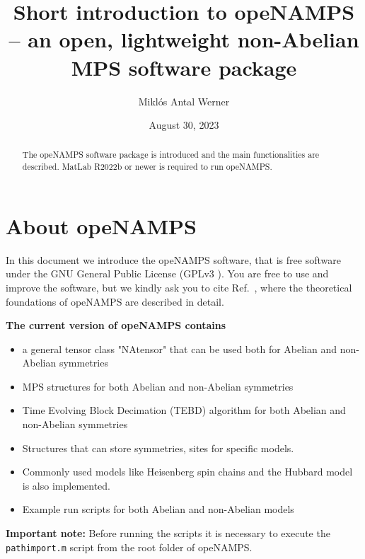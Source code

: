 \documentclass[aps,prb,twocolumn,showpacs,preprintnumbers,amsmath,amssymb, superscriptaddressm, nofootinbib]{revtex4-2}   %
\begin{document}
\title{Short introduction to \textbf{opeNAMPS} -- an open, lightweight non-Abelian MPS software package}

\author{Miklós Antal Werner}
\date{August 30, 2023}
 
\begin{abstract}
 The opeNAMPS software package is introduced and the main functionalities are described. MatLab R2022b or newer is required to run opeNAMPS. 

\end{abstract}
\maketitle

\section{About opeNAMPS}
In this document we introduce the opeNAMPS software, that is free software under the GNU General Public License (GPLv3 \cite{GPLv3}). You are free to use and improve the software, but we kindly ask you to cite Ref.~, where the theoretical foundations of opeNAMPS are described in detail.   

\textbf{The current version of opeNAMPS contains} 
\begin{itemize}
    \item a general tensor class "NAtensor" that can be used both for Abelian and non-Abelian symmetries
    \item MPS structures for both Abelian and non-Abelian symmetries
    \item Time Evolving Block Decimation (TEBD) algorithm for both Abelian and non-Abelian symmetries
    \item Structures that can store symmetries, sites for specific models.
    \item Commonly used models like Heisenberg spin chains and the Hubbard model is also implemented.
    \item Example run scripts for both Abelian and non-Abelian models
\end{itemize}
\textbf{Important note:} Before running the scripts it is necessary to execute the \verb|pathimport.m| script from the root folder of opeNAMPS.
\end{document}
